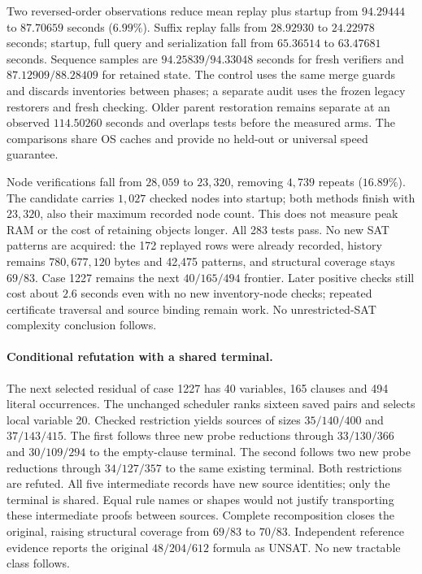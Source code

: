 \documentclass[11pt,a4paper]{article}
\numberwithin{equation}{section}
\theoremstyle{plain}
\theoremstyle{definition}
\theoremstyle{remark}
\begin{document}
Two reversed-order observations reduce mean replay plus startup from
$94.29444$ to $87.70659$ seconds ($6.99\%$). Suffix replay falls from $28.92930$
to $24.22978$ seconds; startup, full query and serialization fall from
$65.36514$ to $63.47681$ seconds. Sequence samples are $94.25839/94.33048$
seconds for fresh verifiers and $87.12909/88.28409$ for retained state.
The control uses the same merge guards and discards inventories between phases;
a separate audit uses the frozen legacy restorers and fresh checking. Older
parent restoration remains separate at an observed $114.50260$ seconds and
overlaps tests before the measured arms. The comparisons share OS caches and
provide no held-out or universal speed guarantee.

Node verifications fall from $28{,}059$ to $23{,}320$, removing $4{,}739$
repeats ($16.89\%$). The candidate carries $1{,}027$ checked nodes into startup;
both methods finish with $23{,}320$, also their maximum recorded node count.
This does not measure peak RAM or the cost of retaining objects longer.
All 283 tests pass. No new SAT patterns are acquired: the 172 replayed rows
were already recorded, history remains $780{,}677{,}120$ bytes and 42,475
patterns, and structural coverage stays $69/83$. Case 1227 remains the next
$40/165/494$ frontier. Later positive checks still cost about $2.6$ seconds
even with no new inventory-node checks; repeated certificate traversal and
source binding remain work. No unrestricted-SAT complexity conclusion follows.

\paragraph{Conditional refutation with a shared terminal.}
The next selected residual of case 1227 has 40 variables, 165 clauses and 494
literal occurrences. The unchanged scheduler ranks sixteen saved pairs and
selects local variable 20. Checked restriction yields sources of sizes
$35/140/400$ and $37/143/415$. The first follows three new probe reductions
through $33/130/366$ and $30/109/294$ to the empty-clause terminal. The second
follows two new probe reductions through $34/127/357$ to the same existing
terminal. Both restrictions are refuted. All five intermediate records have
new source identities; only the terminal is shared. Equal rule names or shapes
would not justify transporting these intermediate proofs between sources.
Complete recomposition closes the original, raising structural coverage from
$69/83$ to $70/83$. Independent reference evidence reports the original
$48/204/612$ formula as UNSAT. No new tractable class follows.
\end{document}
